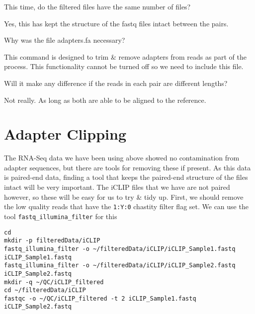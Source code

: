 \begin{questions}
This time, do the filtered files have the same number of files? \\
\begin{answer}
Yes, this has kept the structure of the fastq files intact between the pairs. \\
\end{answer}
Why was the file adapters.fa necessary? \\
\begin{answer}
This command is designed to trim \& remove adapters from reads as part of the process.
This functionality cannot be turned off so we need to include this file.\\
\end{answer}
Will it make any difference if the reads in each pair are different lengths?\\
\begin{answer}
Not really. As long as both are able to be aligned to the reference.
\end{answer}
\end{questions}


\section{Adapter Clipping}
The RNA-Seq data we have been using above showed no contamination from adapter sequences, but there are tools for removing these if present.
As this data is paired-end data, finding a tool that keeps the paired-end structure of the files intact will be very important.
The iCLIP files that we have are not paired however, so these will be easy for us to try \& tidy up.
First, we should remove the low quality reads that have the \texttt{1:Y:0} chastity filter flag set.
We can use the tool \texttt{fastq_illumina_filter} for this
\begin{lstlisting}
cd
mkdir -p filteredData/iCLIP
fastq_illumina_filter -o ~/filteredData/iCLIP/iCLIP_Sample1.fastq iCLIP_Sample1.fastq
fastq_illumina_filter -o ~/filteredData/iCLIP/iCLIP_Sample2.fastq iCLIP_Sample2.fastq
mkdir -q ~/QC/iCLIP_filtered
cd ~/filteredData/iCLIP
fastqc -o ~/QC/iCLIP_filtered -t 2 iCLIP_Sample1.fastq iCLIP_Sample2.fastq
\end{lstlisting}

